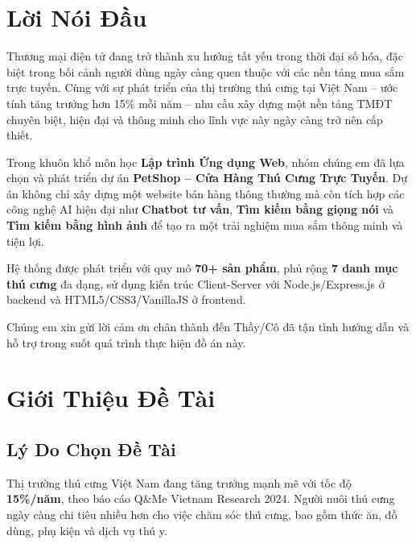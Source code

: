 \documentclass[12pt, a4paper]{report}
\begin{document}
\listoftables
{}
\newpage

\chapter*{Lời Nói Đầu}

Thương mại điện tử đang trở thành xu hướng tất yếu trong thời đại số hóa, đặc biệt trong bối cảnh người dùng ngày càng quen thuộc với các nền tảng mua sắm trực tuyến. Cùng với sự phát triển của thị trường thú cưng tại Việt Nam – ước tính tăng trưởng hơn 15\% mỗi năm – nhu cầu xây dựng một nền tảng TMĐT chuyên biệt, hiện đại và thông minh cho lĩnh vực này ngày càng trở nên cấp thiết.

Trong khuôn khổ môn học \textbf{Lập trình Ứng dụng Web}, nhóm chúng em đã lựa chọn và phát triển dự án \textbf{PetShop – Cửa Hàng Thú Cưng Trực Tuyến}. Dự án không chỉ xây dựng một website bán hàng thông thường mà còn tích hợp các công nghệ AI hiện đại như \textbf{Chatbot tư vấn}, \textbf{Tìm kiếm bằng giọng nói} và \textbf{Tìm kiếm bằng hình ảnh} để tạo ra một trải nghiệm mua sắm thông minh và tiện lợi.

Hệ thống được phát triển với quy mô \textbf{70+ sản phẩm}, phủ rộng \textbf{7 danh mục thú cưng} đa dạng, sử dụng kiến trúc Client-Server với Node.js/Express.js ở backend và HTML5/CSS3/VanillaJS ở frontend.

Chúng em xin gửi lời cảm ơn chân thành đến Thầy/Cô \underline{\hspace{5cm}} đã tận tình hướng dẫn và hỗ trợ trong suốt quá trình thực hiện đồ án này.

\chapter{Giới Thiệu Đề Tài}

\section{Lý Do Chọn Đề Tài}

Thị trường thú cưng Việt Nam đang tăng trưởng mạnh mẽ với tốc độ \textbf{15\%/năm}, theo báo cáo Q\&Me Vietnam Research 2024. Người nuôi thú cưng ngày càng chi tiêu nhiều hơn cho việc chăm sóc thú cưng, bao gồm thức ăn, đồ dùng, phụ kiện và dịch vụ thú y.
\end{document}
